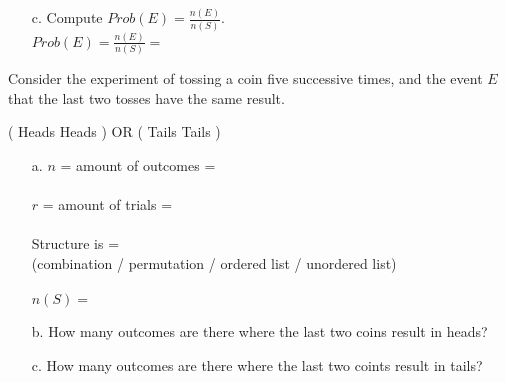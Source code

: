 {\begin{questionNOGRADE}{\thequestion}
\begin{enumerate}
                            $n(E) = $
                            \vspace{1cm}

                \item[c.] Compute $Prob(E) = \frac{n(E)}{n(S)}$. ~\\

                    $Prob(E) = \frac{n(E)}{n(S)} =$
            \end{enumerate}

        \end{questionNOGRADE}

    \newpage


        \begin{questionNOGRADE}{\thequestion}
            Consider the experiment of tossing a coin five successive
            times, and the event $E$ that the last two tosses have the same result. \\
            \begin{center}
            ( \fitb[0.5cm] \fitb[0.5cm] \fitb[0.5cm] Heads Heads ) OR
            ( \fitb[0.5cm] \fitb[0.5cm] \fitb[0.5cm] Tails Tails )
            \end{center}

            \begin{enumerate}
                \item[a.]   $n$ = amount of outcomes =  ~\\~\\
                            $r$ = amount of trials = ~\\~\\
                            Structure is = \\
                            \footnotesize
                            (combination / permutation / ordered list / unordered list)
                            \normalsize ~\\~\\
                            $n(S) = $
                            

                \item[b.]   How many outcomes are there where the last two coins result in heads? \vspace{2cm}

                \item[c.]   How many outcomes are there where the last two coints result in tails? \vspace{2cm}


\end{enumerate}
\end{questionNOGRADE}}
